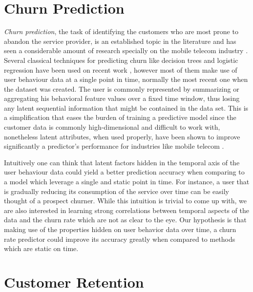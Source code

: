 \documentclass{kththesis}
\begin{document}
\section{Churn Prediction}	
	
	
	\emph{Churn prediction}, the task of identifying the customers who are most prone to abandon the service provider, is an established topic in the literature and has seen a considerable amount of research specially on the mobile telecom industry \citep{Hassouna2015} \citep{Lu2014} \citep{Khan2015}.  Several classical techniques for predicting churn like decision trees and logistic regression have been used on recent work \citep{mahajan2015review}, however most of them make use of user behaviour data at a single point in time, normally the most recent one when the dataset was created. The user is commonly represented by summarizing or aggregating his behavioral feature values over a fixed time window, thus losing any latent sequential information that might be contained in the data set. This is a simplification that eases the burden of training a predictive model since the customer data is commonly high-dimensional and difficult to work with, nonetheless latent attributes, when used properly, have been shown to improve significantly a predictor's performance for industries like mobile telecom \citep{GurAli2014}.
    
    Intuitively one can think that latent factors hidden in the temporal axis of the user behaviour data could yield a better prediction accuracy when comparing to a model which leverage a single and static point in time. For instance, a user that is gradually reducing its consumption of the service over time can be easily thought of a prospect churner. While this intuition is trivial to come up with, we are also interested in learning strong correlations between temporal aspects of the data and the churn rate which are not as clear to the eye. Our hypothesis is that making use of the properties hidden on user behavior data over time, a churn rate predictor could improve its accuracy greatly when compared to methods which are static on time. 
    
\section{Customer Retention} 

    
\end{document}
